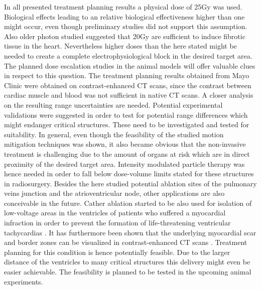 \documentclass[type=dr, dr=rernat, accentcolor=tud7b,colorbacktitle, bigchapter, openright, twoside, 12pt ]{tudthesis}
\begin{document}
\newline
In all presented treatment planning results a 
physical dose of 25Gy was used. Biological effects leading to an relative biological effectiveness higher than one might occur, even though 
preliminary studies did not support this assumption. Also older photon studied suggested that 20Gy are sufficient to induce fibrotic tissue 
in the heart. Nevertheless higher doses than the here stated might be needed to create a complete electrophysiological block in the desired 
target area. The planned dose escalation studies in the animal models will offer valuable clues in respect to this question. 
The treatment planning results obtained from Mayo Clinic were obtained on contrast-enhanced CT scans, since the contrast between cardiac muscle 
and blood was not sufficient in native CT scans. A closer analysis on the resulting range uncertainties are needed. Potential 
experimental validations were suggested in order to test for potential range differences which might endanger critical structures. These 
need to be investigated and tested for suitability.\newline
\newline
In general, even though the feasibility of the studied motion mitigation techniques was shown, it also became obvious that the non-invasive 
treatment is challenging due to the amount of organs at risk which are in direct proximity of the desired target area. 
Intensity modulated particle therapy was hence needed in order to fall below dose-volume limits stated for these structures in radiosurgery. 
Besides the here studied potential ablation sites of the pulmonary veins junction and the atrioventricular node, other applications are also 
conceivable in the future. Cather ablation started to be also used for isolation of low-voltage areas in the ventricles of patients who 
suffered a myocardial infraction in order to prevent the formation of life-threatening ventricular tachycardias \cite{Til14} \cite{Mad14}. 
It has furthermore been shown that the underlying myocardial scar and border zones can be visualized in contrast-enhanced CT scans \cite{Tia14}. 
Treatment planning for this condition is hence potentially feasible. Due to the larger distance of the ventricles to many critical structures 
this delivery might even be easier achievable. The feasibility is planned to be tested in the upcoming animal experiments. 
\end{document}
